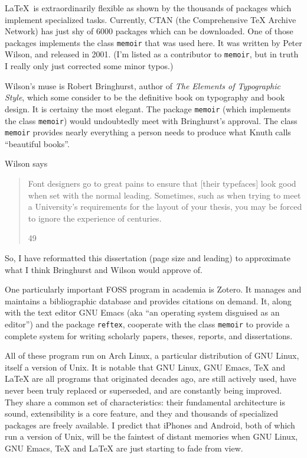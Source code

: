 LaTeX is extraordinarily flexible as shown by the thousands of packages which implement specialized tasks. Currently, CTAN (the Comprehensive TeX Archive Network) has just shy of 6000 packages which can be downloaded. One of those packages implements the class \texttt{memoir} that was used here. It was written by Peter Wilson, and released in 2001. (I'm listed as a contributor to \texttt{memoir}, but in truth I really only just corrected some minor typos.)
\newpage
\begin{center}
  \textbf{\quad\quad{}\quad\quad{}\quad\quad{}\quad\quad{}}
\end{center}
Wilson's muse is Robert Bringhurst, author of \textit{The Elements of Typographic Style}, which some consider to be the definitive book on typography and book design. It is certainy the most elegant. The package \texttt{memoir} (which implements the class \texttt{memoir}) would undoubtedly meet with Bringhurst's approval.  The class \texttt{memoir} provides nearly everything a person needs to produce what Knuth calls ``beautiful books''.

Wilson says \blockquote[49][\parencite{Wilson2024}]{Font designers go to great pains to ensure that [their typefaces] look good when set with the normal leading. Sometimes, such as when trying to meet a University’s requirements for the layout of your thesis, you may be forced to ignore the experience of centuries.} So, I have reformatted this dissertation (page size and leading) to approximate what I think Bringhurst and Wilson would approve of.
\begin{center}
  \textbf{\quad\quad{}\quad\quad{}\quad\quad{}\quad\quad{}}
\end{center}
One particularly important FOSS program in academia is Zotero. It manages and maintains a bibliographic database and provides citations on demand. It, along with the text editor GNU Emacs (aka ``an operating system disguised as an editor'') and the package \texttt{reftex}, cooperate with the class \texttt{memoir} to provide a complete system for writing scholarly papers, theses, reports, and dissertations.
\begin{center}
  \textbf{\quad\quad{}\quad\quad{}\quad\quad{}\quad\quad{}}
\end{center}
All of these program run on Arch Linux, a particular distribution of GNU Linux, itself a version of Unix. It is notable that GNU Linux, GNU Emacs, \TeX{} and \LaTeX{} are all programs that originated decades ago, are still actively used, have never been truly replaced or superseded, and are constantly being improved. They share a common set of characteristics: their fundamental architecture is sound, extensibility is a core feature, and they and thousands of specialized packages are freely available. I predict that iPhones and Android, both of which run a version of Unix, will be the faintest of distant memories when GNU Linux, GNU Emacs, \TeX{} and \LaTeX{} are just starting to fade from view.

